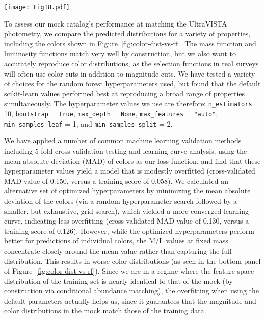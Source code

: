 \documentclass[twocolumn,twocolappendix]{aastex63}
\begin{document}
\begin{figure*}[ht!]
\centering
\texttt{[image: Fig18.pdf]}
\caption{Comparison of the color distributions between UniverseMachine mock galaxies (blue lines) and the UltraVISTA data (grey bands) that they were fit to at the redshift slice $0.8<z<0.9$. The fits in the top panel use the default scikit-learn hyperparameters, while those in the bottom panel use cross-validation-optimized hyperparameters. By construction, the optimized hyperparameters predict colors with a lower mean absolute deviation. However, we adopt the default parameters due to their significantly better performance at reproducing the distributions as a whole.
\label{fig:color-dist-vs-rf}}
\end{figure*}

To assess our mock catalog's performance at matching the UltraVISTA photometry, we compare the predicted distributions for a variety of properties, including the colors shown in Figure~\ref{fig:color-dist-vs-rf}. The mass function and luminosity functions match very well by construction, but we also want to accurately reproduce color distributions, as the selection functions in real surveys will often use color cuts in addition to magnitude cuts. We have tested a variety of choices for the random forest hyperparameters used, but found that the default scikit-learn  values performed best at reproducing a broad range of properties simultaneously. The hyperparameter values we use are therefore: \verb|n_estimators| = 10, \verb|bootstrap| = \verb|True|, \verb|max_depth| = \verb|None|, \verb|max_features| = \verb|"auto"|, \verb|min_samples_leaf| = 1, and \verb|min_samples_split| = 2.

We have applied a number of common machine learning validation methods including 5-fold cross-validation testing and learning curve analysis, using the mean absolute deviation (MAD) of colors as our loss function, and find that these hyperparameter values yield a model that is modestly overfitted (cross-validated MAD value of 0.150, versus a training score of 0.058). We calculated an alternative set of optimized hyperparameters by minimizing the mean absolute deviation of the colors (via a random hyperparameter search followed by a smaller, but exhaustive, grid search), which yielded a more converged learning curve, indicating less overfitting (cross-validated MAD value of 0.130, versus a training score of 0.126). However, while the optimized hyperparameters perform better for predictions of individual colors, the M/L values at fixed mass concentrate closely around the mean value rather than capturing the full distribution. This results in worse color distributions (as seen in the bottom panel of Figure~\ref{fig:color-dist-vs-rf}). Since we are in a regime where the feature-space distribution of the training set is nearly identical to that of the mock (by construction via conditional abundance matching), the overfitting when using the default parameters actually helps us, since it guarantees that the magnitude and color distributions in the mock match those of the training data.
\end{document}
